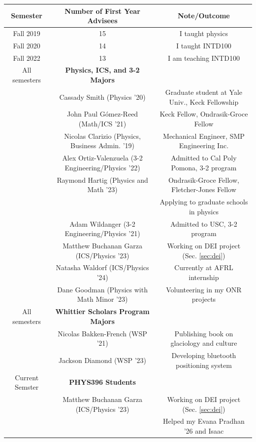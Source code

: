\documentclass[../../main.tex]{subfiles}
\begin{document}
\begin{table}[ht]
\footnotesize
\centering
\begin{tabular}{| c | c | c |}
\hline
\hline
Semester & \textbf{Number of First Year Advisees} & Note/Outcome \\ \hline
Fall 2019 & 15 & I taught physics \\ \hline
Fall 2020 & 14 & I taught INTD100 \\ \hline
Fall 2022 & 13 & I am teaching INTD100 \\ \hline
\hline
All semesters & \textbf{Physics, ICS, and 3-2 Majors} & \\ \hline 
& Cassady Smith (Physics '20) & Graduate student at Yale Univ., Keck Fellowship \\ \hline
& John Paul G\'{o}mez-Reed (Math/ICS '21) & Keck Fellow, Ondrasik-Groce Fellow \\ \hline
& Nicolas Clarizio (Physics, Business Admin. '19) & Mechanical Engineer, SMP Engineering Inc. \\ \hline
& Alex Ortiz-Valenzuela (3-2 Engineering/Physics  '22) & Admitted to Cal Poly Pomona, 3-2 program \\ \hline
& Raymond Hartig (Physics and Math '23) & Ondrasik-Groce Fellow, Fletcher-Jones Fellow \\ & & Applying to graduate schools in physics \\ \hline
& Adam Wildanger (3-2 Engineering/Physics '21) & Admitted to USC, 3-2 program \\ \hline
& Matthew Buchanan Garza (ICS/Physics '23) & Working on DEI project (Sec. \ref{sec:dei}) \\ \hline
& Natasha Waldorf (ICS/Physics '24) & Currently at AFRL internship \\ \hline
& Dane Goodman (Physics with Math Minor '23) & Volunteering in my ONR projects \\ \hline \hline
All semesters & \textbf{Whittier Scholars Program Majors} & \\ \hline
& Nicolas Bakken-French (WSP '21) & Publishing book on glaciology and culture \\ \hline
& Jackson Diamond (WSP '23) & Developing bluetooth positioning system \\ \hline \hline
Current Semster & \textbf{PHYS396 Students}  & \\ \hline
& Matthew Buchanan Garza (ICS/Physics '23) & Working on DEI project (Sec. \ref{sec:dei}) \\ & & Helped my Evana Pradhan '26 and Isaac \\ \hline

\end{tabular}
\end{table}
\end{document}
